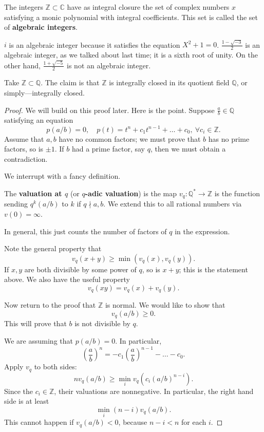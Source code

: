 \begin{example}
The integers $\mathbb{Z} \subset \mathbb{C}$ have as integral closure the set
of complex numbers $x$ satisfying a monic polynomial with integral
coefficients.  This set is called the set of \textbf{algebraic integers}.
\end{example}

\begin{example}
$i$ is an algebraic integer because it satisfies the equation $X^2 +1 = 0$.
$\frac{1 - \sqrt{-3}}{2}$ is an algebraic integer, as we talked about last
time; it is a sixth root of unity.  On the other hand, $\frac{1+\sqrt{-5}}{2}$
is not an algebraic integer.
\end{example}

\begin{example}
Take $\mathbb{Z} \subset \mathbb{Q}$. The claim is that $\mathbb{Z}$ is
integrally closed in its quotient field $\mathbb{Q}$, or simply---integrally
closed.
\end{example}
\begin{proof}
We will build on this proof later. Here is the point. Suppose $\frac{a}{b}
\in \mathbb{Q}$ satisfying an equation
\[ p(a/b) = 0, \quad p(t) = t^n + c_1 t^{n-1} + \dots + c_0 , \ \forall c_i \in
\mathbb{Z}.\]
Assume that $a,b$ have no common factors; we must prove that $b$ has no prime
factors, so is $\pm 1$.
If $b$ had a prime factor, say $q$, then we must obtain a contradiction.

We interrupt with a fancy definition.
\begin{definition}
The \textbf{valuation at $q$} (or \textbf{$q$-adic valuation}) is the map
$v_q: \mathbb{Q}^* \to \mathbb{Z}$ is the
function sending $q^k (a/b)$ to $k$ if $q \nmid a,b$. We extend this to all
rational numbers via $v(0) = \infty$.
\end{definition}
In general, this just counts the number of factors of $q$ in the expression.


Note the general property that
\[ v_q(x+y) \geq \min( v_q(x), v_q(y)) . \]
If $x,y$ are both divisible by some power of $q$, so is $x+y$; this is the
statement above. We also have the useful property
\[ v_q(xy) = v_q(x) + v_q(y).  \]




Now return to the proof that $\mathbb{Z}$ is normal. We would like to show that
\[ v_q(a/b) \geq 0.  \]
This will prove that $b$ is not divisible by $q$.

We are assuming that $p(a/b) = 0$. In particular,
\[ \left( \frac{a}{b}  \right)^n = -c_1 \left( \frac{a}{b}  \right)^{n-1} -
\dots - c_0.  \]
Apply $v_q$ to both sides:
\[ n v_q ( a/b) \geq \min_i v_q( c_i (a/b)^{n-i}).  \]
Since the $c_i \in \mathbb{Z}$, their valuations are nonnegative. In
particular, the right hand side is at least
\[ \min_i  (n-i) v_q(a/b). \]
This cannot happen if $v_q(a/b)<0$, because $n-i < n$ for each $i$.
\end{proof}

